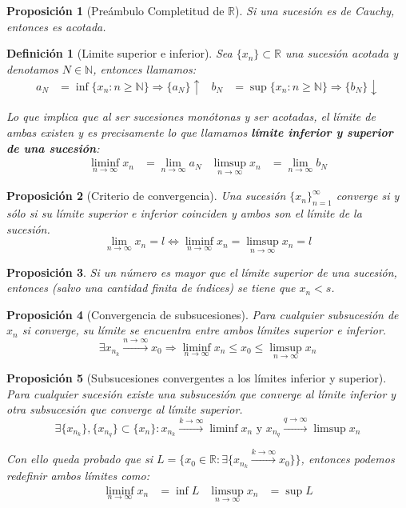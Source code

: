 \documentclass[10pt,a4paper,openright]{book}
\newtheorem{proposicion}{Proposición}[chapter]
\newtheorem{definicion}{Definición}[chapter]
\begin{document}
\begin{proposicion}[Preámbulo Completitud de $\mathbb R$]
Si una sucesión es de Cauchy, entonces es acotada.
\end{proposicion}

\begin{definicion}[Limite superior e inferior]
Sea $\{x_n\}\subset \mathbb R$ una sucesión acotada y denotamos $N\in \mathbb N$, entonces llamamos:
\begin{align*}
a_N & =\inf\{x_n: n\geq \mathbb N\}\Rightarrow \{a_N\}\uparrow  & b_N & =\sup\{x_n: n\geq \mathbb N\}\Rightarrow \{b_N\}\downarrow
\end{align*}

Lo que implica que al ser sucesiones monótonas y ser acotadas, el límite de ambas existen y es precisamente lo que llamamos \textbf{límite inferior y superior de una sucesión}:
\begin{align*}
\liminf_{n\rightarrow\infty}x_n & =\lim_{n\rightarrow\infty}a_N & \limsup_{n\rightarrow\infty}x_n &=\lim_{n\rightarrow\infty}b_N
\end{align*}

\end{definicion}

\begin{proposicion}[Criterio de convergencia]
Una sucesión $\{x_n\}_{n=1}^\infty$ converge si y sólo si su límite superior e inferior coinciden y ambos son el límite de la sucesión.
$$\lim_{n\rightarrow \infty}x_n=l\Leftrightarrow \liminf_{n\rightarrow\infty}x_n= \limsup_{n\rightarrow\infty}x_n=l$$
\end{proposicion}

\begin{proposicion}
Si un número es mayor que el límite superior de una sucesión, entonces (salvo una cantidad finita de índices) se tiene que $x_n<s$.
\end{proposicion}

\begin{proposicion}[Convergencia de subsucesiones]
Para cualquier subsucesión de $x_n$ si converge, su límite se encuentra entre ambos límites superior e inferior.
$$\exists x_{n_k}\xrightarrow{n\rightarrow\infty}x_0\Rightarrow \liminf_{n\rightarrow\infty} x_n \leq x_0 \leq \limsup_{n\rightarrow\infty} x_n$$
\end{proposicion}

\begin{proposicion}[Subsucesiones convergentes a los límites inferior y superior]
Para cualquier sucesión existe una subsucesión que converge al límite inferior y otra subsucesión que converge al límite superior.
$$\exists \{x_{n_k}\}, \{x_{n_q}\}\subset \{x_n\}: x_{n_k}\xrightarrow{k\rightarrow \infty} \liminf x_n \mbox{ y } x_{n_q}\xrightarrow{q\rightarrow \infty} \limsup x_n$$

Con ello queda probado que si $L=\{x_0\in \mathbb R: \exists \{x_{n_k}\xrightarrow{k\rightarrow \infty} x_0\}\}$, entonces podemos redefinir ambos límites como:
\begin{align*}
\liminf_{n\rightarrow\infty}x_n &=\inf L &
\limsup_{n\rightarrow\infty}x_n &=\sup L
\end{align*}
\end{proposicion}
\end{document}
